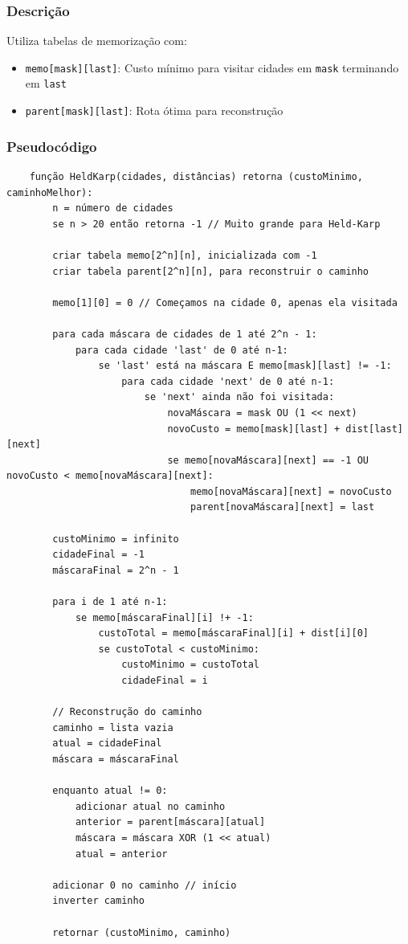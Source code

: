 \subsubsection{Descrição}
Utiliza tabelas de memorização com:
\begin{itemize}
\item \texttt{memo[mask][last]}: Custo mínimo para visitar cidades em \texttt{mask} terminando em \texttt{last}
\item \texttt{parent[mask][last]}: Rota ótima para reconstrução
\end{itemize}

\subsubsection{Pseudocódigo}
\begin{verbatim}
    função HeldKarp(cidades, distâncias) retorna (custoMinimo, caminhoMelhor):
        n = número de cidades
        se n > 20 então retorna -1 // Muito grande para Held-Karp
    
        criar tabela memo[2^n][n], inicializada com -1
        criar tabela parent[2^n][n], para reconstruir o caminho
    
        memo[1][0] = 0 // Começamos na cidade 0, apenas ela visitada
    
        para cada máscara de cidades de 1 até 2^n - 1:
            para cada cidade 'last' de 0 até n-1:
                se 'last' está na máscara E memo[mask][last] != -1:
                    para cada cidade 'next' de 0 até n-1:
                        se 'next' ainda não foi visitada:
                            novaMáscara = mask OU (1 << next)
                            novoCusto = memo[mask][last] + dist[last][next]
                            se memo[novaMáscara][next] == -1 OU novoCusto < memo[novaMáscara][next]:
                                memo[novaMáscara][next] = novoCusto
                                parent[novaMáscara][next] = last
    
        custoMinimo = infinito
        cidadeFinal = -1
        máscaraFinal = 2^n - 1
    
        para i de 1 até n-1:
            se memo[máscaraFinal][i] !+ -1:
                custoTotal = memo[máscaraFinal][i] + dist[i][0]
                se custoTotal < custoMinimo:
                    custoMinimo = custoTotal
                    cidadeFinal = i
    
        // Reconstrução do caminho
        caminho = lista vazia
        atual = cidadeFinal
        máscara = máscaraFinal
    
        enquanto atual != 0:
            adicionar atual no caminho
            anterior = parent[máscara][atual]
            máscara = máscara XOR (1 << atual)
            atual = anterior
    
        adicionar 0 no caminho // início
        inverter caminho
    
        retornar (custoMinimo, caminho)
\end{verbatim}


